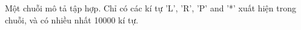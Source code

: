 Một chuỗi mô tả tập hợp. Chỉ có các kí tự 'L', 'R', 'P' and '*' xuất hiện trong chuỗi, và có nhiều nhất 10000 kí tự.